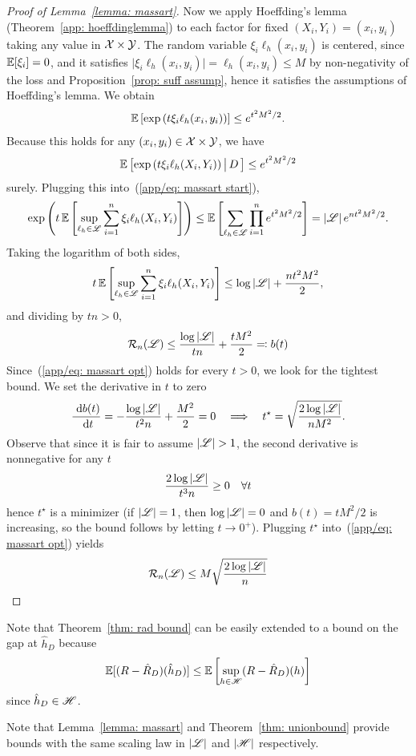 \documentclass[reqno]{amsart}
\begin{document}
\begin{lemma}[Massart]
\begin{proof}[Proof of Lemma~\ref{lemma: massart}]
Now we apply Hoeffding's lemma (Theorem~\ref{app: hoeffdinglemma}) to each factor for fixed $(X_i,Y_i)=(x_i,y_i)$ taking any value in $\mathcal{X}\times\mathcal{Y}$. The random variable $\xi_i\ell_h(x_i,y_i)$ is centered, since $\mathbb{E}[\xi_i]=0$, and it satisfies $\vert\xi_i\ell_h(x_i,y_i)\vert = \ell_h(x_i,y_i)\le M$ by non-negativity of the loss and Proposition~\ref{prop: suff assump}, hence it satisfies the assumptions of Hoeffding's lemma. We obtain
\[
\mathbb{E}\left[\exp\left(t\xi_i\ell_h(x_i,y_i)\right)\right] \le e^{t^2M^2/2}.
\]
Because this holds for any $(x_i,y_i)\in\mathcal{X}\times\mathcal{Y}$, we have
\[
\mathbb{E}\left[\exp\left(t\xi_i\ell_h(X_i,Y_i)\right)\big\vert\,D\,\right] \le e^{t^2M^2/2}
\]
surely.
Plugging this into~(\ref{app/eq: massart start}),
\[
\exp\left(t\,\mathbb{E}\left[\sup_{\ell_h\in\mathscr{L}}\sum_{i=1}^n \xi_i\ell_h(X_i,Y_i)\right]\right) \le \mathbb{E}\left[\sum_{\ell_h\in\mathscr{L}}\prod_{i=1}^n e^{t^2M^2/2}\right] = \vert\mathscr{L}\vert\, e^{nt^2M^2/2}.
\]
Taking the logarithm of both sides,
\[
t\,\mathbb{E}\left[\sup_{\ell_h\in\mathscr{L}}\sum_{i=1}^n \xi_i\ell_h(X_i,Y_i)\right] \le \log\vert\mathscr{L}\vert + \frac{nt^2M^2}{2},
\]
and dividing by $tn>0$,
\begin{equation}\label{app/eq: massart opt}
\mathcal R_n(\mathscr{L}) \le \frac{\log\vert\mathscr{L}\vert}{tn} + \frac{tM^2}{2} \eqqcolon b(t)
\end{equation}
Since~(\ref{app/eq: massart opt}) holds for every $t>0$, we look for the tightest bound. We set the derivative in $t$ to zero
\[
\frac{\mathop{}\!\,\,\mathrm{d} b(t)}{\mathop{}\!\,\,\mathrm{d} t}= 
-\frac{\log\vert\mathscr{L}\vert}{t^2n} + \frac{M^2}{2} = 0 \quad\Longrightarrow\quad t^\star = \sqrt{\frac{2\log\vert\mathscr{L}\vert}{nM^2}}.
\]
Observe that since it is fair to assume $\vert\mathscr{L}\vert>1$, the second derivative is nonnegative for any $t$
\[\frac{2\log\vert\mathscr{L}\vert}{t^3n}\ge0 \quad \forall t\] hence $t^\star$ is a minimizer (if $\vert\mathscr{L}\vert = 1$, then $\log\vert\mathscr{L}\vert=0$ and $b(t)=tM^2/2$ is increasing, so the bound follows by letting $t\to0^+$). Plugging $t^\star$ into~(\ref{app/eq: massart opt}) yields
\[
\mathcal R_n(\mathscr{L}) \le M\sqrt{\frac{2\log\vert\mathscr{L}\vert}{n}}
\]
\end{proof}
\end{lemma}

Note that Theorem~\ref{thm: rad bound} can be easily extended to a bound on the gap at $\hat h_D$ because
\[
\mathbb{E}[(R - \hat R_D)(\hat h_D)] \le \mathbb{E}\left[\sup_{h \in \mathscr{H}}(R - \hat R_D)(h)\right]
\]
since $\hat h_D\in\mathscr{H}$. 

Note that Lemma~\ref{lemma: massart} and Theorem~\ref{thm: unionbound} provide bounds with the same scaling law in $\vert \mathscr{L}\vert$ and $\vert \mathscr{H}\vert$ respectively.
\end{document}
